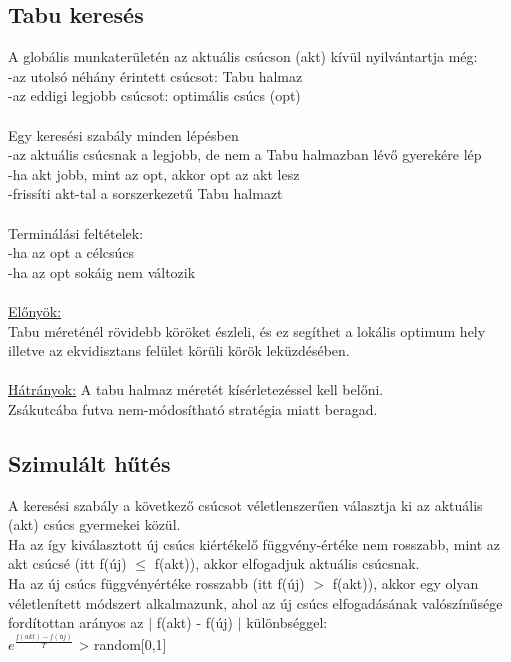 \documentclass{article}
\begin{document}
	 \subsection{Tabu keresés}
	 A globális munkaterületén az aktuális csúcson (akt) kívül nyilvántartja még:\\
	 \hspace*{0,5em} -az utolsó néhány érintett csúcsot: Tabu halmaz\\
	 \hspace*{0,5em} -az eddigi legjobb csúcsot: optimális csúcs (opt)\\ \\
	 Egy keresési szabály minden lépésben\\
	 \hspace*{0,5em} -az aktuális csúcsnak a legjobb, de nem a Tabu halmazban lévő gyerekére lép\\
	 \hspace*{0,5em} -ha akt jobb, mint az opt, akkor opt az akt lesz\\
	 \hspace*{0,5em} -frissíti akt-tal a sorszerkezetű Tabu halmazt\\ \\
	 Terminálási feltételek:\\
	 \hspace*{0,5em} -ha az opt a célcsúcs\\
	 \hspace*{0,5em} -ha az opt sokáig nem változik \\ \\
	 \underline{Előnyök:}\\
	 Tabu méreténél rövidebb köröket észleli, és ez segíthet a lokális optimum hely illetve az ekvidisztans felület körüli körök leküzdésében.\\ \\
	 \underline{Hátrányok:}
	 A tabu halmaz méretét kísérletezéssel kell belőni. \\
	 Zsákutcába futva nem-módosítható stratégia miatt beragad.
	 
	 \subsection{Szimulált hűtés}
	 A keresési szabály a következő csúcsot véletlenszerűen választja ki az aktuális (akt) csúcs gyermekei közül.\\
	 Ha az így kiválasztott új csúcs kiértékelő függvény-értéke nem rosszabb, mint az akt csúcsé (itt f(új) $\leq$ f(akt)), akkor elfogadjuk aktuális csúcsnak.\\
	 Ha az új csúcs függvényértéke rosszabb (itt f(új) $>$ f(akt)), akkor egy olyan véletlenített módszert alkalmazunk, ahol az új csúcs elfogadásának valószínűsége fordítottan arányos az $|$ f(akt) - f(új) $|$ különbséggel: \\
	 $e^\frac{f(akt)-f(új)}{T}$ > random[0,1] \\
	 
\end{document}
